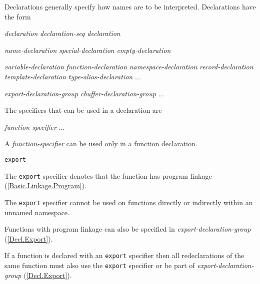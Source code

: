 \p Declarations generally specify how names are to be interpreted. Declarations have the form
\begin{grammar}
  \br
  \textit{declaration}\br
  \textit{declaration-seq declaration}

  \br
  \textit{name-declaration}\br
  \textit{special-declaration}\br
  \textit{empty-declaration}

  \br
  \textit{variable-declaration}\br
  \textit{function-declaration}\br
  \textit{namespace-declaration}\br
  \textit{record-declaration}\br
  \textit{template-declaration}\br
  \textit{type-alias-declaration}\br
  ...
  
  \br
  \textit{export-declaration-group}\br
  \textit{cbuffer-declaration-group}\br
  ...

   \terminal{;}
  
\end{grammar}

\p The specifiers that can be used in a declaration are
\begin{grammar}
  \br
  \textit{function-specifier}\br
  ...
\end{grammar}


\p A \textit{function-specifier} can be used only in a function declaration.

\begin{grammar}
  \br
  \texttt{export}\br
\end{grammar}

\p The \texttt{export} specifier denotes that the function has program linkage (\ref{Basic.Linkage.Program}).

\p The \texttt{export} specifier cannot be used on functions directly or indirectly within an unnamed namespace.

\p Functions with program linkage can also be specified in \textit{export-declaration-group} (\ref{Decl.Export}).

\p If a function is declared with an \texttt{export} specifier then all redeclarations of the same function must also use the \texttt{export} specifier or be part of \textit{export-declaration-group} (\ref{Decl.Export}).


